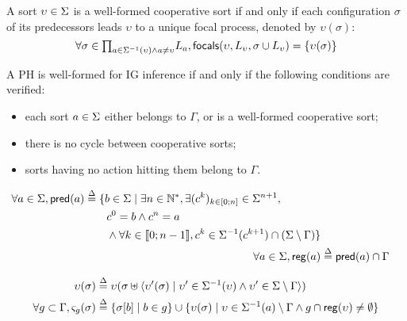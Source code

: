 \begin{property}\label{pro:wf-cooperative-sort}
A sort $\upsilon\in\Sigma$ is a well-formed cooperative sort if and only if
each configuration $\sigma$ of its predecessors leads $\upsilon$ to a unique focal process,
denoted by $\upsilon(\sigma)$:
\[
\forall \sigma \in {\textstyle\prod_{
a\in\Sigma^{-1}(\upsilon) \wedge a\neq \upsilon}}
L_{a},
\mathsf{focals}(\upsilon,L_\upsilon,\sigma \cup L_\upsilon) = \{ \upsilon(\sigma) \}\]
\end{property}

\begin{property}\label{pro:wf-ph}
A PH is well-formed for IG inference if and only if the following conditions are verified:
\begin{itemize}
  \item each sort $a\in\Sigma$ either belongs to $\Gamma$, or is a well-formed cooperative sort;
  \item there is no cycle between cooperative sorts;
  \item sorts having no action hitting them belong to $\Gamma$.
\end{itemize}
\end{property}




\begin{align}
\begin{split}
\forall a \in \Sigma, \mathsf{pred}(a) &\stackrel{\Delta}= \{b \in \Sigma \mid \exists n \in \mathbb{N}^*, \exists
(c^k)_{k \in [0;n]} \in \Sigma^{n+1}, \\
                                   & \quad \quad c^0 = b \wedge c^n = a \\
                                   & \quad \quad \wedge \forall k \in \llbracket 0 ; n-1 \rrbracket,
                                                                   c^k \in \Sigma^{-1}(c^{k+1}) \cap (\Sigma\setminus\Gamma)\}
\end{split}
\label{eq:ph_predec}
\\
\forall a\in \Sigma, \mathsf{reg}({a}) & \stackrel{\Delta}= \mathsf{pred}(a) \cap \Gamma
\label{eq:regulators}
\end{align}

\begin{align}
\upsilon(\sigma) & \stackrel{\Delta}=
\upsilon(\sigma \uplus \langle \upsilon'(\sigma) \mid
        \upsilon'\in\Sigma^{-1}(\upsilon) \wedge
        \upsilon'\in\Sigma\setminus\Gamma  \rangle)
\label{eq:cooperative-eval}
\\
\forall g\subset \Gamma,
        \varsigma_g(\sigma) & \stackrel{\Delta}= \{ \sigma[b] \mid b\in g \} \cup \{ \upsilon(\sigma) \mid
\upsilon\in\Sigma^{-1}(a) \setminus \Gamma \wedge g\cap \mathsf{reg}({\upsilon}) \neq \emptyset \}
\label{eq:ctx-sigma}
\end{align}

